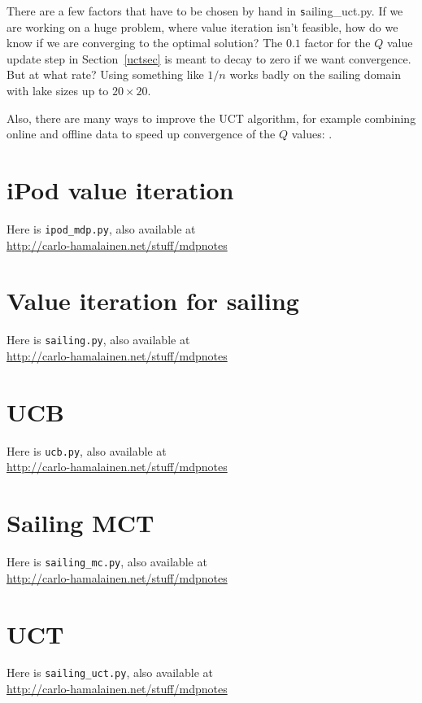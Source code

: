 \documentclass[12pt,amstags,fleqn]{article}
\theoremstyle{plain}
\theoremstyle{definition}
\theoremstyle{definition}
\begin{document}
There are a few factors that have to be chosen by hand in {\texttt
sailing\_uct.py}. If we are working on a huge problem, where value
iteration isn't feasible, how do we know if we are converging to the
optimal solution? The $0.1$ factor for the $Q$ value update step in
Section~\ref{uctsec} is meant to decay to zero if we want convergence.
But at what rate? Using something like $1/n$ works badly
on the sailing domain with lake sizes up to $20 \times 20$.

Also, there are many ways to improve the UCT algorithm, for example
combining online and offline data to speed up convergence of the $Q$
values: \cite{citeulike:2976742}.

\clearpage
\section{iPod value iteration}\label{secipodpython}

Here is \texttt{ipod\_mdp.py}, also available at\\
\url{http://carlo-hamalainen.net/stuff/mdpnotes}



\clearpage
\section{Value iteration for sailing}\label{pythonsailing}

Here is \texttt{sailing.py}, also available at\\
\url{http://carlo-hamalainen.net/stuff/mdpnotes}



\clearpage
\section{UCB}\label{pythonucb}

Here is \texttt{ucb.py}, also available at\\
\url{http://carlo-hamalainen.net/stuff/mdpnotes}



\clearpage
\section{Sailing MCT}\label{pythonmc}

Here is \texttt{sailing\_mc.py}, also available at\\
\url{http://carlo-hamalainen.net/stuff/mdpnotes}



\clearpage
\section{UCT}\label{pythonuct}

Here is \texttt{sailing\_uct.py}, also available at\\
\url{http://carlo-hamalainen.net/stuff/mdpnotes}






\end{document}
